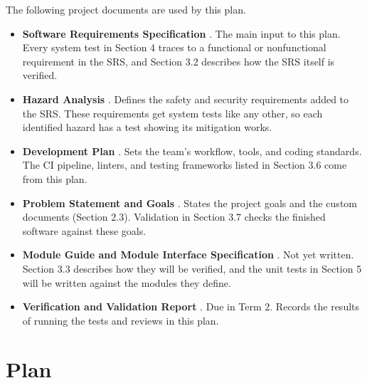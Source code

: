 \documentclass[12pt, titlepage]{article}
\begin{document}


The following project documents are used by this plan.

\begin{itemize}
  \item \textbf{Software Requirements Specification} \citep{SRS}. The main
  input to this plan. Every system test in Section 4 traces to a functional or
  nonfunctional requirement in the SRS, and Section 3.2 describes how the SRS
  itself is verified.
  \item \textbf{Hazard Analysis} \citep{HazardAnalysis}. Defines the safety
  and security requirements added to the SRS. These requirements get system
  tests like any other, so each identified hazard has a test showing its
  mitigation works.
  \item \textbf{Development Plan} \citep{DevelopmentPlan}. Sets the team's
  workflow, tools, and coding standards. The CI pipeline, linters, and testing
  frameworks listed in Section 3.6 come from this plan.
  \item \textbf{Problem Statement and Goals} \citep{ProblemStatement}. States
  the project goals and the custom documents (Section 2.3). Validation in
  Section 3.7 checks the finished software against these goals.
  \item \textbf{Module Guide and Module Interface Specification}
  \citep{MG, MIS}. Not yet written. Section 3.3 describes how they will be
  verified, and the unit tests in Section 5 will be written against the
  modules they define.
  \item \textbf{Verification and Validation Report} \citep{VnVReport}. Due in
  Term 2. Records the results of running the tests and reviews in this plan.
\end{itemize}

\section{Plan}
\end{document}
